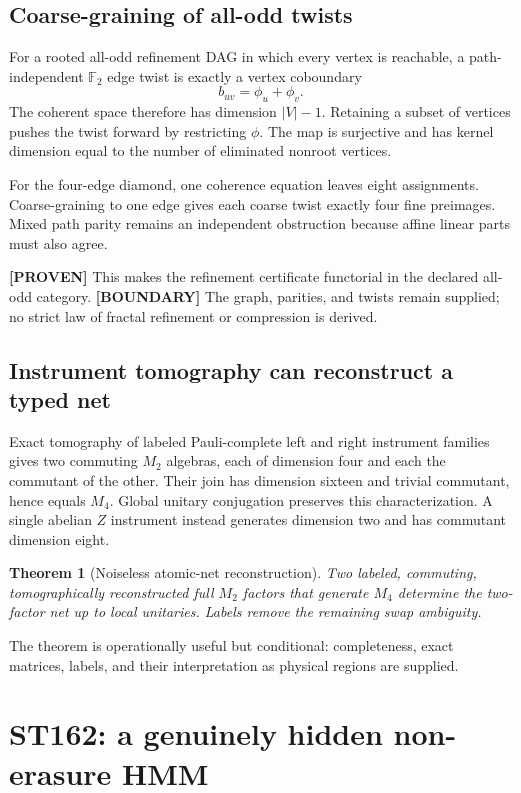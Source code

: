 \documentclass[11pt,a4paper]{article}
\newtheorem{theorem}{Theorem}[section]
\newcommand{\proven}{\textcolor{green!40!black}{\textbf{[PROVEN]}}}
\newcommand{\statusboundary}{\textcolor{orange!80!black}{\textbf{[BOUNDARY]}}}
\begin{document}
\subsection{Coarse-graining of all-odd twists}

For a rooted all-odd refinement DAG in which every vertex is reachable, a path-independent $\mathbb F_2$ edge twist is exactly a vertex coboundary
\[
b_{uv}=\phi_u+\phi_v.
\]
The coherent space therefore has dimension $|V|-1$. Retaining a subset of vertices pushes the twist forward by restricting $\phi$. The map is surjective and has kernel dimension equal to the number of eliminated nonroot vertices.

For the four-edge diamond, one coherence equation leaves eight assignments. Coarse-graining to one edge gives each coarse twist exactly four fine preimages. Mixed path parity remains an independent obstruction because affine linear parts must also agree.

\proven{} This makes the refinement certificate functorial in the declared all-odd category. \statusboundary{} The graph, parities, and twists remain supplied; no strict law of fractal refinement or compression is derived.

\subsection{Instrument tomography can reconstruct a typed net}

Exact tomography of labeled Pauli-complete left and right instrument families gives two commuting $M_2$ algebras, each of dimension four and each the commutant of the other. Their join has dimension sixteen and trivial commutant, hence equals $M_4$. Global unitary conjugation preserves this characterization. A single abelian $Z$ instrument instead generates dimension two and has commutant dimension eight.

\begin{theorem}[Noiseless atomic-net reconstruction]
Two labeled, commuting, tomographically reconstructed full $M_2$ factors that generate $M_4$ determine the two-factor net up to local unitaries. Labels remove the remaining swap ambiguity.
\end{theorem}

The theorem is operationally useful but conditional: completeness, exact matrices, labels, and their interpretation as physical regions are supplied.

\section{ST162: a genuinely hidden non-erasure HMM}
\end{document}
